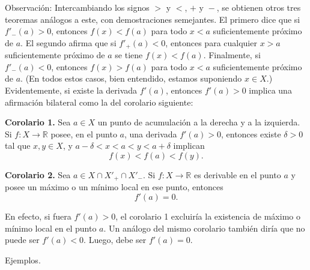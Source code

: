 \documentclass[12pt,oneside]{book}
\begin{document}
Observación: Intercambiando los signos \( > \text{ y } < \), \( + \text{ y } - \), se obtienen otros tres teoremas análogos a este, con demostraciones semejantes. El primero dice que si \( f'_-(a) > 0 \), entonces \( f(x) < f(a) \) para todo \( x < a \) suficientemente próximo de \( a \). El segundo afirma que si \( f'_+(a) < 0 \), entonces para cualquier \( x > a \) suficientemente próximo de \( a \) se tiene \( f(x) < f(a) \). Finalmente, si \( f'_-(a) < 0 \), entonces \( f(x) > f(a) \) para todo \( x < a \) suficientemente próximo de \( a \). (En todos estos casos, bien entendido, estamos suponiendo \( x \in X \).) Evidentemente, si existe la derivada \( f'(a) \), entonces \( f'(a) > 0 \) implica una afirmación bilateral como la del corolario siguiente:

\textbf{Corolario 1.} Sea \( a \in X \) un punto de acumulación a la derecha y a la izquierda. Si \( f: X \to \mathbb{R} \) posee, en el punto \( a \), una derivada \( f'(a) > 0 \), entonces existe \( \delta > 0 \) tal que \( x, y \in X \), y \( a - \delta < x < a < y < a + \delta \) implican
\[
f(x) < f(a) < f(y).
\]

\textbf{Corolario 2.} Sea \( a \in X \cap X'_+ \cap X'_- \). Si \( f: X \to \mathbb{R} \) es derivable en el punto \( a \) y posee un máximo o un mínimo local en ese punto, entonces
\[
f'(a) = 0.
\]

En efecto, si fuera \( f'(a) > 0 \), el corolario 1 excluiría la existencia de máximo o mínimo local en el punto \( a \). Un análogo del mismo corolario también diría que no puede ser \( f'(a) < 0 \). Luego, debe ser \( f'(a) = 0 \).

Ejemplos.
\end{document}
